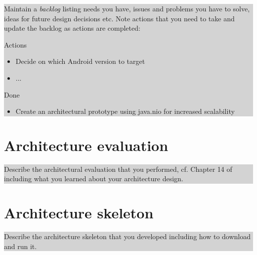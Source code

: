 \documentclass[a4paper,11pt]{report}
\newcommand{\instructions}[1]{
  \noindent\colorbox{lightgray}{%
    \parbox{\linewidth}{%
      #1
    }%
  }%
 \vspace{0.1cm}
}
\begin{document}
\instructions{ Maintain a \emph{backlog} listing needs you have,
  issues and problems you have to solve, ideas for future design
  decisions etc. Note actions that you need to take and update the
  backlog as actions are completed:

\bigskip
Actions

\begin{itemize}
\item Decide on which Android version to target
\item ...
\end{itemize}

Done

\begin{itemize}
\item Create an architectural prototype using java.nio for increased
  scalability

\end{itemize}


}

\chapter{Architecture evaluation}
\label{cha:arch-eval}
\thispagestyle{fancy}

\instructions{
Describe the architectural evaluation that you performed, cf. Chapter
14 of~\citet{rozanski2011software} including what you learned about
your architecture design.
}

\chapter{Architecture skeleton}
\label{cha:arch-prot}
\thispagestyle{fancy}
\instructions{ 
Describe the architecture skeleton that you developed
  including how to download and run it.
}





% 
% 


\end{document}
